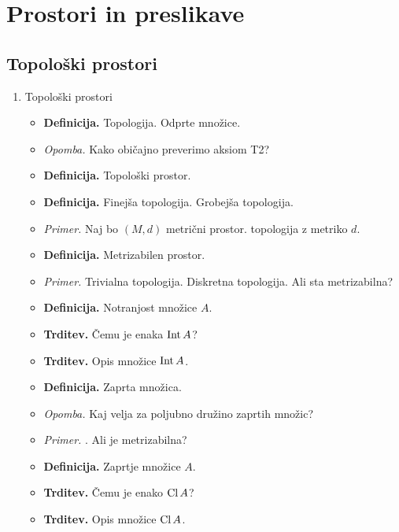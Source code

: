\section{Prostori in preslikave}

\subsection{Topološki prostori}
\begin{enumerate}
    \item Topološki prostori
    \begin{itemize}
        \item \colorbox{purple!30}{\textbf{Definicija.}} Topologija. Odprte množice.
        \item \colorbox{yellow!30}{\emph{Opomba.}} Kako običajno preverimo aksiom T2?
        \item \colorbox{purple!30}{\textbf{Definicija.}} Topološki prostor.
        \item \colorbox{purple!30}{\textbf{Definicija.}} Finejša topologija. Grobejša topologija.         
        \item \colorbox{yellow!30}{\emph{Primer.}} Naj bo $(M, d)$ metrični prostor.  topologija z metriko $d$.
        \item \colorbox{purple!30}{\textbf{Definicija.}} Metrizabilen prostor.
        \item \colorbox{yellow!30}{\emph{Primer.}} Trivialna topologija. Diskretna topologija. Ali sta metrizabilna?
        \item \colorbox{purple!30}{\textbf{Definicija.}} Notranjost množice $A$.
        \item \colorbox{blue!30}{\textbf{Trditev.}} Čemu je enaka $\operatorname{Int} A$?
        \item \colorbox{blue!30}{\textbf{Trditev.}} Opis množice $\operatorname{Int} A$.
        \item \colorbox{purple!30}{\textbf{Definicija.}} Zaprta množica.
        \item \colorbox{yellow!30}{\emph{Opomba.}} Kaj velja za poljubno družino zaprtih množic? 
        \item \colorbox{yellow!30}{\emph{Primer.}} . Ali je metrizabilna?
        \item \colorbox{purple!30}{\textbf{Definicija.}} Zaprtje množice $A$.
        \item \colorbox{blue!30}{\textbf{Trditev.}} Čemu je enako $\operatorname{Cl} A$?
        \item \colorbox{blue!30}{\textbf{Trditev.}} Opis množice $\operatorname{Cl} A$. 

\end{itemize}
\end{enumerate}
